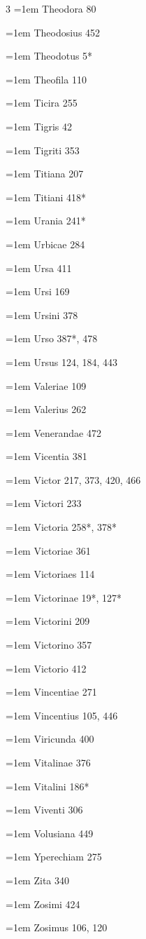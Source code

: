 \begin{multicols}{3}
\hangindent=1em Theodora 80\par
\hangindent=1em Theodosius 452\par
\hangindent=1em Theodotus 5*\par
\hangindent=1em Theofila 110\par
\hangindent=1em Ticira 255\par
\hangindent=1em Tigris 42\par
\hangindent=1em Tigriti 353\par
\hangindent=1em Titiana 207\par
\hangindent=1em Titiani 418*\par
\hangindent=1em Urania 241*\par
\hangindent=1em Urbicae 284\par
\hangindent=1em Ursa 411\par
\hangindent=1em Ursi 169\par
\hangindent=1em Ursini 378\par
\hangindent=1em Urso 387*, 478\par
\hangindent=1em Ursus 124, 184, 443\par
\hangindent=1em Valeriae 109\par
\hangindent=1em Valerius 262\par
\hangindent=1em Venerandae 472\par
\hangindent=1em Vicentia 381\par
\hangindent=1em Victor 217, 373, 420, 466\par
\hangindent=1em Victori 233\par
\hangindent=1em Victoria 258*, 378*\par
\hangindent=1em Victoriae 361\par
\hangindent=1em Victoriaes 114\par
\hangindent=1em Victorinae 19*, 127*\par
\hangindent=1em Victorini 209\par
\hangindent=1em Victorino 357\par
\hangindent=1em Victorio 412\par
\hangindent=1em Vincentiae 271\par
\hangindent=1em Vincentius 105, 446\par
\hangindent=1em Viricunda 400\par
\hangindent=1em Vitalinae 376\par
\hangindent=1em Vitalini 186*\par
\hangindent=1em Viventi 306\par
\hangindent=1em Volusiana 449\par
\hangindent=1em Yperechiam 275\par
\hangindent=1em Zita 340\par
\hangindent=1em Zosimi 424\par
\hangindent=1em Zosimus 106, 120\par\end{multicols}
